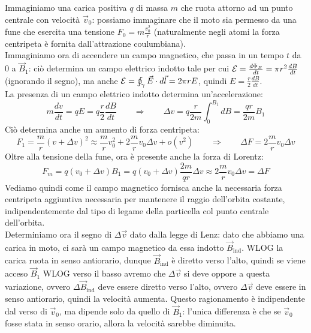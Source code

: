 Immaginiamo una carica positiva $ q $ di massa $ m $ che ruota attorno ad un punto centrale con velocità $ \vec{v}_0 $: possiamo immaginare che il moto sia permesso da una fune che esercita una tensione $ F_0 = m \frac{v_0^2}{r} $ (naturalmente negli atomi la forza centripeta è fornita dall'attrazione coulumbiana). \\ 
%
Immaginiamo ora di accendere un campo magnetico, che passa in un tempo $ t $ da $ 0 $ a $ \vec{B}_1 $: ciò determina un campo elettrico indotto tale per cui $ \mathcal{E} = \frac{d\Phi_B}{dt} = \pi r^2 \frac{dB}{dt} $ (ignorando il segno), ma anche $ \mathcal{E} = \oint_{\gamma} \vec{E} \cdot d\vec{l} = 2\pi r E $, quindi $ E = \frac{r}{2}\frac{dB}{dt} $. \\ 
%
La presenza di un campo elettrico indotto determina un'accelerazione:
\begin{equation}
	m \frac{dv}{dt} = qE = q \frac{r}{2} \frac{dB}{dt} \qquad\Longrightarrow\qquad \Delta v = q \frac{r}{2m} \int_0^{B_1} dB = \frac{qr}{2m} B_1
	\label{eq:3}
\end{equation}
Ciò determina anche un aumento di forza centripeta:
\begin{equation}
	F_1 = \frac{m}{r} (v + \Delta v)^2 \approx \frac{m}{r} v_0^2 + 2 \frac{m}{r} v_0 \Delta v + o(v^2) \qquad\Longrightarrow\qquad \Delta F = 2 \frac{m}{r} v_0 \Delta v
	\label{eq:4}
\end{equation}
Oltre alla tensione della fune, ora è presente anche la forza di Lorentz:
\begin{equation}
	F_m = q (v_0 + \Delta v) B_1 = q (v_0 + \Delta v) \frac{2m}{qr} \Delta v \approx 2 \frac{m}{r} v_0 \Delta v = \Delta F
	\label{eq:5}
\end{equation}
Vediamo quindi come il campo magnetico fornisca anche la necessaria forza centripeta aggiuntiva necessaria per mantenere il raggio dell'orbita costante, indipendentemente dal tipo di legame della particella col punto centrale dell'orbita. \\ 
%
Determiniamo ora il segno di $ \Delta\vec{v} $ dato dalla legge di Lenz: dato che abbiamo una carica in moto, ci sarà un campo magnetico da essa indotto $ \vec{B}_{\text{ind}} $. WLOG la carica ruota in senso antiorario, dunque $ \vec{B}_{\text{ind}} $ è diretto verso l'alto, quindi se viene acceso $ \vec{B}_1 $ WLOG verso il basso avremo che $ \Delta\vec{v} $ si deve oppore a questa variazione, ovvero $ \Delta\vec{B}_{\text{ind}} $ deve essere diretto verso l'alto, ovvero $ \Delta\vec{v} $ deve essere in senso antiorario, quindi la velocità aumenta. Questo ragionamento è indipendente dal verso di $ \vec{v}_0 $, ma dipende solo da quello di $ \vec{B}_1 $: l'unica differenza è che se $ \vec{v}_0 $ fosse stata in senso orario, allora la velocità sarebbe diminuita.

